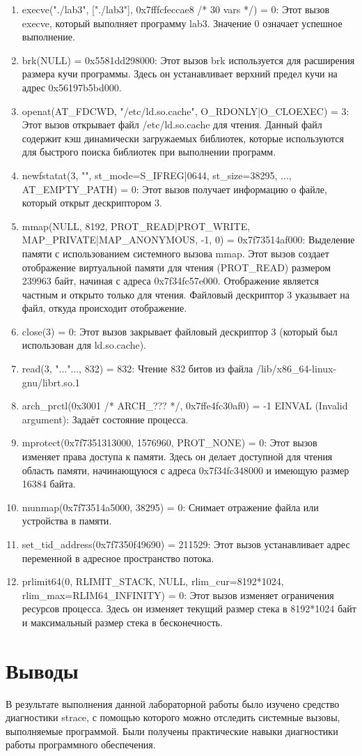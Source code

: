 \documentclass[a4paper, 12pt]{article}
\begin{document}
\begin{enumerate}
    \item execve("./lab3", ["./lab3"], 0x7fffcfeccae8 /* 30 vars */) = 0: Этот вызов execve, который выполняет программу lab3. Значение 0 означает успешное выполнение.
    \item brk(NULL)                               = 0x5581dd298000: Этот вызов brk используется для расширения размера кучи программы. Здесь он устанавливает верхний предел кучи на адрес 0x56197b5bd000.
    \item openat(AT\_FDCWD, "/etc/ld.so.cache", O\_RDONLY|O\_CLOEXEC) = 3: Этот вызов открывает файл /etc/ld.so.cache для чтения. Данный файл содержит кэш динамически загружаемых библиотек, которые используются для быстрого поиска библиотек при выполнении программ.
    \item newfstatat(3, "", {st\_mode=S\_IFREG|0644, st\_size=38295, ...}, AT\_EMPTY\_PATH) = 0:
    Этот вызов получает информацию о файле, который открыт дескриптором 3.
    \item mmap(NULL, 8192, PROT\_READ|PROT\_WRITE, MAP\_PRIVATE|MAP\_ANONYMOUS, -1, 0) = 0x7f73514af000: 
    Выделение памяти с использованием системного вызова mmap. Этот вызов создает отображение виртуальной памяти для чтения (PROT\_READ) размером 239963 байт, начиная с адреса 0x7f34fc57e000. Отображение является частным и открыто только для чтения. Файловый дескриптор 3 указывает на файл, откуда происходит отображение.
    \item close(3) = 0: Этот вызов закрывает файловый дескриптор 3 (который был использован для ld.so.cache).
    \item read(3, "..."..., 832) = 832:
    Чтение 832 битов из файла /lib/x86\_64-linux-gnu/librt.so.1
    \item arch\_prctl(0x3001 /* ARCH\_??? */, 0x7ffe4fc30af0) = -1 EINVAL (Invalid argument): Задаёт состояние процесса.
    \item mprotect(0x7f7351313000, 1576960, PROT\_NONE) = 0: Этот вызов изменяет права доступа к памяти. Здесь он делает доступной для чтения область памяти, начинающуюся с адреса 0x7f34fc348000 и имеющую размер 16384 байта.
    \item munmap(0x7f73514a5000, 38295)           = 0: Снимает отражение файла или устройства в памяти.
    \item set\_tid\_address(0x7f7350f49690)         = 211529: Этот вызов устанавливает адрес переменной в адресное пространство потока.
    \item prlimit64(0, RLIMIT\_STACK, NULL, {rlim\_cur=8192*1024, rlim\_max=RLIM64\_INFINITY}) = 0: Этот вызов изменяет ограничения ресурсов процесса. Здесь он изменяет текущий размер стека в 8192*1024 байт и максимальный размер стека в бесконечность.
\end{enumerate}

\newpage
\section{Выводы}

В результате выполнения данной лабораторной работы было изучено средство диагностики strace, с помощью которого можно отследить системные вызовы, выполняемые программой. Были получены практические навыки диагностики работы программного обеспечения.
\end{document}
